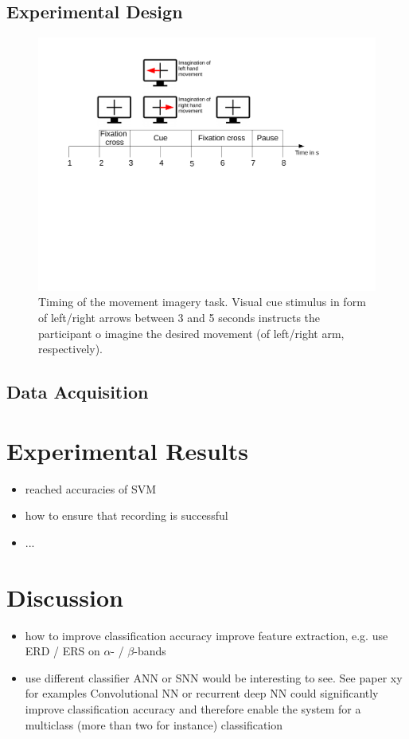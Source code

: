 \documentclass[a4paper,twoside, openright,12pt]{report}
\begin{document}
\subsection{Experimental Design}

\begin{figure}
	\centering
	\includegraphics[width=1\linewidth]{./gfx/exp_design}
	\caption{Timing of the movement imagery task. Visual cue stimulus in form of left/right arrows between 3 and 5 seconds instructs the participant o imagine the desired movement (of left/right arm, respectively).}
	\label{fig:exp_design}
\end{figure}

\subsection{Data Acquisition}


\section{Experimental Results}

\begin{itemize}
	\item reached accuracies of SVM
	\item how to ensure that recording is successful  
	\item ...
\end{itemize}


\section{Discussion}
\begin{itemize}
	\item how to improve classification accuracy
	\subitem improve feature extraction, e.g. use ERD / ERS on $\alpha$- / $\beta$-bands 
	\item use different classifier 
	\subitem ANN or SNN would be interesting to see. See paper xy for examples
	\subitem Convolutional NN or recurrent deep NN could significantly improve classification accuracy and therefore enable the system for a multiclass (more than two for instance) classification 
\end{itemize}
\end{document}
